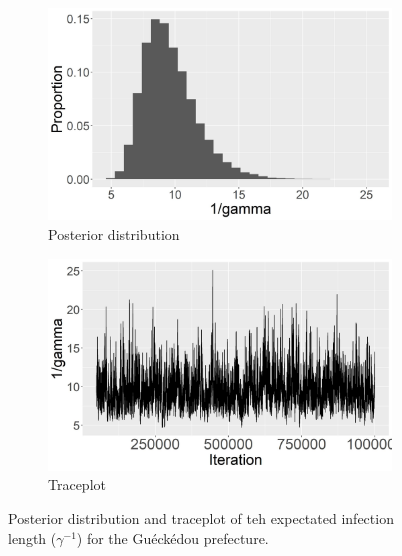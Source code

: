 \documentclass[11pt]{article}
\begin{document}
	\begin{figure}
		\centering
		\begin{subfigure}[b]{0.45\textwidth}
			\centering
			\includegraphics[width=\textwidth]{E5_expected_infection_length_hist}
			\caption{Posterior distribution}
			\label{fig:E5_gamma_hist}
		\end{subfigure}
		\hfill
		\begin{subfigure}[b]{0.45\textwidth}
			\centering
			\includegraphics[width=\textwidth]{E5_expected_infection_length_tp}
			\caption{Traceplot}
			\label{fig:density_R0}
		\end{subfigure}
		\caption{Posterior distribution and traceplot of teh expectated infection length ($\gamma^{-1}$) for the Gu\'eck\'edou prefecture.}
		\label{fig:ebola}
	\end{figure}
	
\end{document}
